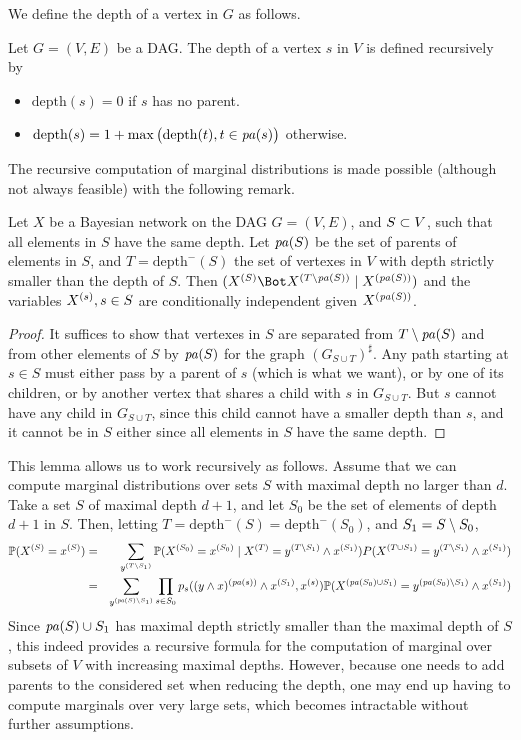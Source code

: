 We define the
depth of a vertex in $G$ as follows.
\begin{definition}
\label{def:depth}
Let $G=(V,E)$ be a DAG. The depth of a vertex $s$ in $V$ is defined
recursively by
\begin{itemize}[labelindent=0.5cm]
\item[-] $\mathrm{depth}(s) = 0$ if $s$ has no parent.
\item[-] $\mathrm{depth}(s) = 1 + \max\big(\mathrm{depth}(t), t\in
{\mathit{pa}(s)}\big)$ otherwise.
\end{itemize}
\end{definition}

The recursive computation of marginal distributions is made possible
(although not always feasible)
with the following remark.
\begin{lemma}
\label{lem:c.i.dag}
Let $X$ be a Bayesian network on the DAG $G=(V,E)$, and $S\subset V$,
such that all elements in $S$ have the same depth. Let
${\mathit{pa}(S)}$ be the set of parents of elements in $S$, and $T =
\mathrm{depth}^-(S)$ the set of vertexes in $V$ with depth strictly smaller
than the depth of $S$. Then 
$\cind{\pe XS}{\pe X{T\setm \pa{S}}}{\pe X{\pa{S}}}$ and the variables $X^{(s)}, s\in S$
are conditionally independent given $X^{({\mathit{pa}(S)})}$. 
\end{lemma}
\begin{proof}
It suffices to show that vertexes in $S$ are separated from  $T\setminus
{\mathit{pa}(S)}$ and from other elements of $S$ by ${\mathit{pa}(S)}$ for the
graph $(G_{S\cup T})^\sharp$. Any path starting at $s\in S$ must either
pass by a parent of $s$ (which is what we want), or by one of its children, or by another
vertex that shares a child with $s$ in $G_{S\cup T}$. But $s$ cannot have any
child in $G_{S\cup T}$, since this child cannot have a smaller depth
than $s$,
and it cannot be in $S$ either since all elements in $S$ have the same
depth.
\end{proof}
This lemma allows us to work recursively as follows. Assume that we can
compute marginal distributions over sets $S$ with maximal depth no
larger than $d$. Take a set $S$ of maximal depth $d+1$, and let $S_0$ be the
set of elements of depth $d+1$ in $S$. Then, letting
$T=\mathrm{depth}^-(S) = \mathrm{depth}^-(S_0)$, and $S_1 = S\setminus S_0$,
\begin{eqnarray}
\nonumber
\bm{\mathbb P}(X^{(S)} = x^{(S)}) &=& \sum_{y^{(T\setminus S_1)}} \bm{\mathbb P}(X^{(S_0)} = x^{(S_0)} \mid X^{(T)} = y^{(T\setminus S_1)}\wedge
x^{(S_1)}) P(X^{(T\cup S_1)} =  y^{(T\setminus S_1)}\wedge x^{(S_1)})\\
\label{eq:rec.inf}
&=& \sum_{y^{({\mathit{pa}(S)}\setminus S_1)}} \prod_{s\in S_0} p_s((y\wedge x)^{({\mathit{pa}(s)})}\wedge
x^{(S_1)}, x^{(s)}) \bm{\mathbb P}(X^{({\mathit{pa}(S_0)}\cup S_1)} = y^{({\mathit{pa}(S_0)}\setminus S_1)}\wedge x^{(S_1)})
\end{eqnarray}
Since ${\mathit{pa}(S)}\cup S_1$ has maximal depth strictly smaller than the
maximal depth of $S$, this indeed provides a recursive formula for the
computation of marginal over subsets of $V$ with increasing maximal
depths. However, because one needs to add parents to the
considered set when reducing the depth, one may end up having to
compute marginals over very large sets, which becomes intractable
without further assumptions.

